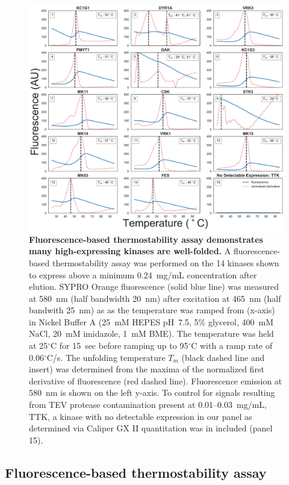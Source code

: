 \documentclass[phd,tocprelim]{cornell}
\begin{document}
\begin{landscape}
	\begin{figure}[p]
		\centering
		\includegraphics[width=0.6\linewidth]{figures/bothplates_dualaxis_tm}
 \caption[ Fluorescence-based thermostability assay demonstrates many high-expressing kinases are well-folded.]{{\bf Fluorescence-based thermostability assay demonstrates many high-expressing kinases are well-folded.}
	A fluorescence-based thermostability assay was performed on the 14 kinases shown to express above a minimum 0.24~mg/mL concentration after elution. 
	SYPRO Orange fluorescence (solid blue line) was measured at 580~nm (half bandwidth 20~nm) after excitation at 465~nm (half bandwith 25~nm) as as the temperature was ramped from (x-axis) in Nickel Buffer A (25~mM HEPES pH~7.5, 5\% glycerol, 400~mM NaCl, 20~mM imidazole, 1~mM BME). The temperature was held at 25$^{\circ}$C for 15~sec before ramping up to 95$^{\circ}$C with a ramp rate of 0.06$^{\circ}$C/s. 
	The unfolding temperature $T_m$ (black dashed line and insert) was determined from the maxima of the normalized first derivative of fluorescence (red dashed line). 
	Fluorescence emission at 580~nm is shown on the left y-axis.   
	To control for signals resulting from TEV protease contamination present at 0.01--0.03~mg/mL, TTK, a kinase with no detectable expression in our panel as determined via Caliper GX II quantitation was in included (panel 15). 
}
\label{fig:thermofluor}
	\end{figure}
\end{landscape}

\subsection{Fluorescence-based thermostability assay}
\end{document}

